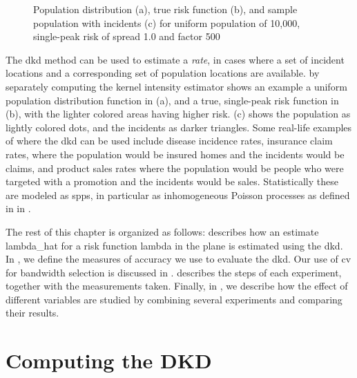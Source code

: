 \begin{figure}[htbp]
    
    \caption[]{Population distribution (a), true risk function (b), and sample population with incidents (c) for uniform population of 10,000, single-peak risk of \gls{spread} 1.0 and \gls{factor} 500}
    \label{fig:method:distributions:unif_500_1.0_1h}    
\end{figure}
\setpath{}
The \gls{dkd} method can be used to estimate a \textit{rate},
in cases where a set of incident locations and a corresponding set of population locations are available.
by separately computing the \gls{kernel intensity estimator}
 shows an example a uniform population distribution function in (a),
and a true, single-peak risk function in (b),
with the lighter colored areas having higher risk.
(c) shows the population as lightly colored dots,
and the incidents as darker triangles.
Some real-life examples of where the \gls{dkd} can be used include disease incidence rates,
insurance claim rates,
where the population would be insured homes and the incidents would be claims,
and product sales rates where the population would be people who were targeted with a promotion and the incidents would be sales.
Statistically these are modeled as \glspl{spp},
in particular as inhomogeneous Poisson processes
as defined in  in .

The rest of this chapter is organized as follows:
 describes how an estimate \gls{lambda_hat} for a risk function \gls{lambda} in the plane is estimated using the \gls{dkd}.
In , we define the measures of accuracy we use to evaluate the \gls{dkd}.
Our use of \gls{cv} for bandwidth selection is discussed in .
 describes the steps of each experiment, together with the measurements taken.
Finally, in , we describe how the effect of different variables are studied by combining several experiments and comparing their results.

\section{Computing the DKD}
\label{sec:method:computing}

